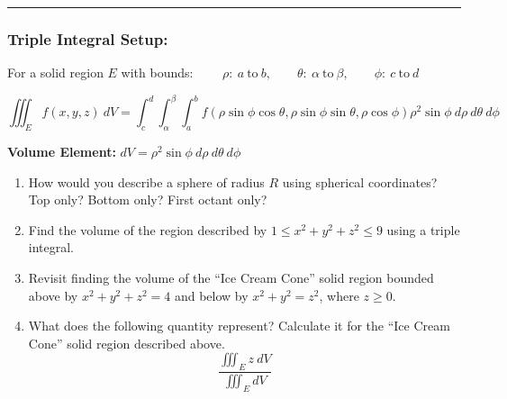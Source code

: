 
\vspace*{.1in}
\hrule
\vspace*{.2in}


\subsubsection*{Triple Integral Setup:}
For a solid region \({E}\) with bounds:
\(\qquad \rho:\ a\ \text{to}\ b, \qquad \theta:\ \alpha\ \text{to}\ \beta, \qquad \phi:\ c\ \text{to}\ d\)

\[
\iiint_{E} f(x,y,z)\ dV 
=\int_c^d\int_\alpha^\beta \int_a^b  f\left(\rho\sin\phi\cos\theta, 
\rho\sin\phi\sin\theta,\rho\cos\phi\right) \rho^2\sin\phi\ d\rho\ d\theta\ d\phi
\]

\textbf{Volume Element: }\({dV = \rho^2\sin\phi\ d\rho\ d\theta\ d\phi}\)





\begin{enumerate}[{Example} 1: ]

\item How would you describe a sphere of radius \(R\) using spherical coordinates? Top only? Bottom only? First octant only?

\vfill

\item Find the volume of the region described by \(1\leq x^2+y^2+z^2\leq 9\) using a triple integral.
\vfill

\item Revisit finding the volume of the ``Ice Cream Cone'' solid region bounded above by \(x^2+y^2+z^2=4\) and below by \(x^2+y^2 = z^2\), where \(z\geq 0\).

\vfill

\item %
What does the following quantity represent? Calculate it for the ``Ice Cream Cone'' solid region described above.
\[\frac{\displaystyle \iiint_{E} z\ dV}{\displaystyle \iiint_{E}  dV}\]


\end{enumerate}

